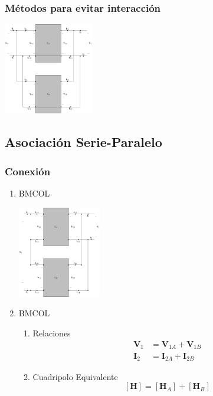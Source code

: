 \subsubsection{Métodos para evitar interacción}
\label{sec:org3abee48}
\begin{center}
\includegraphics[height=4cm]{../figs/paralelo-paralelo-corto.pdf}
\end{center}
\subsection{Asociación Serie-Paralelo}
\label{sec:orgc44bd68}
\subsubsection{Conexión}
\label{sec:orgcba0d44}
\begin{enumerate}
\item \hfill{}\textsc{BMCOL}
\label{sec:orgb6b388b}
\begin{center}
\includegraphics[height=4cm]{../figs/serie-paralelo.pdf}
\end{center}
\item \hfill{}\textsc{BMCOL}
\label{sec:org547d1ed}
\begin{enumerate}
\item Relaciones
\label{sec:org9cf9c76}
\begin{align*}
  \mathbf{V}_1 &= \mathbf{V}_{1A} + \mathbf{V}_{1B}\\
  \mathbf{I}_2 &= \mathbf{I}_{2A} + \mathbf{I}_{2B}
\end{align*}

\item Cuadripolo Equivalente
\label{sec:orgb751890}
\[
  \boxed{[\mathbf{H}] = [\mathbf{H}_A] + [\mathbf{H}_B]}
\]
\end{enumerate}
\end{enumerate}
